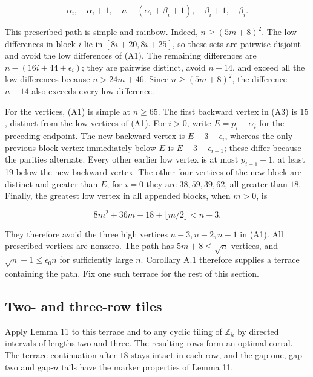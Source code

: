 \documentclass[11pt,a4paper]{article}
\begin{document}
\begin{equation}
\alpha_i,\quad \alpha_i+1,\quad
 n-(\alpha_i+\beta_i+1),\quad
 \beta_i+1,\quad\beta_i.
\tag{A4}\label{eq:A4}
\end{equation}

This prescribed path is simple and rainbow. Indeed, \(n\geq(5m+8)^2\). The low differences in block \(i\) lie in \([8i+20,8i+25]\), so these sets are pairwise disjoint and avoid the low differences of (A1). The remaining differences are \(n-(16i+44+\epsilon_i)\); they are pairwise distinct, avoid \(n-14\), and exceed all the low differences because \(n>24m+46\). Since \(n\geq(5m+8)^2\), the difference \(n-14\) also exceeds every low difference.

For the vertices, (A1) is simple at \(n\geq65\). The first backward vertex in (A3) is \(15\), distinct from the low vertices of (A1). For \(i>0\), write \(E=p_i-\alpha_i\) for the preceding endpoint. The new backward vertex is \(E-3-\epsilon_i\), whereas the only previous block vertex immediately below \(E\) is \(E-3-\epsilon_{i-1}\); these differ because the parities alternate. Every other earlier low vertex is at most \(p_{i-1}+1\), at least 19 below the new backward vertex. The other four vertices of the new block are distinct and greater than \(E\); for \(i=0\) they are \(38,59,39,62\), all greater than \(18\). Finally, the greatest low vertex in all appended blocks, when \(m>0\), is

\[
 8m^2+36m+18+\lfloor m/2\rfloor<n-3.
\]

They therefore avoid the three high vertices \(n-3,n-2,n-1\) in (A1). All prescribed vertices are nonzero. The path has \(5m+8\leq\sqrt n\) vertices, and \(\sqrt n-1\leq\epsilon_0n\) for sufficiently large \(n\). Corollary A.1 therefore supplies a terrace containing the path. Fix one such terrace for the rest of this section.

\hypertarget{two--and-three-row-tiles}{%
\subsection{Two- and three-row tiles}\label{two--and-three-row-tiles}}

Apply Lemma 11 to this terrace and to any cyclic tiling of \(\mathbb Z_h\) by directed intervals of lengths two and three. The resulting rows form an optimal corral. The terrace continuation after \(18\) stays intact in each row, and the gap-one, gap-two and gap-\(n\) tails have the marker properties of Lemma 11.
\end{document}
